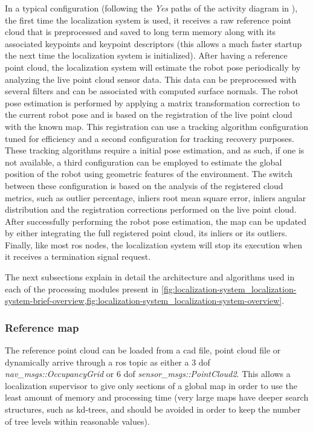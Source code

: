 In a typical configuration (following the \emph{Yes} paths of the activity diagram in ), the first time the localization system is used, it receives a raw reference point cloud that is preprocessed and saved to long term memory along with its associated keypoints and keypoint descriptors (this allows a much faster startup the next time the localization system is initialized). After having a reference point cloud, the localization system will estimate the robot pose periodically by analyzing the live point cloud sensor data. This data can be preprocessed with several filters and can be associated with computed surface normals. The robot pose estimation is performed by applying a matrix transformation correction to the current robot pose and is based on the registration of the live point cloud with the known map. This registration can use a tracking algorithm configuration tuned for efficiency and a second configuration for tracking recovery purposes. These tracking algorithms require a initial pose estimation, and as such, if one is not available, a third configuration can be employed to estimate the global position of the robot using geometric features of the environment. The switch between these configuration is based on the analysis of the registered cloud metrics, such as outlier percentage, inliers root mean square error, inliers angular distribution and the registration corrections performed on the live point cloud. After successfully performing the robot pose estimation, the map can be updated by either integrating the full registered point cloud, its inliers or its outliers. Finally, like most \gls{ros} nodes, the localization system will stop its execution when it receives a termination signal request.

The next subsections explain in detail the architecture and algorithms used in each of the processing modules present in \cref{fig:localization-system_localization-system-brief-overview,fig:localization-system_localization-system-overview}.


\subsubsection{Reference map}

The reference point cloud can be loaded from a \gls{cad} file, point cloud file or dynamically arrive through a \gls{ros} topic as either a 3 \gls{dof} \emph{nav\_msgs::OccupancyGrid} or 6 \gls{dof} \emph{sensor\_msgs::PointCloud2}. This allows a localization supervisor to give only sections of a global map in order to use the least amount of memory and processing time (very large maps have deeper search structures, such as kd-trees, and should be avoided in order to keep the number of tree levels within reasonable values).



